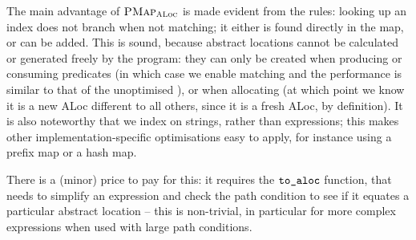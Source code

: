 The main advantage of $\textsc{PMap}_{\textsc{ALoc}}$ is made evident from the rules: looking up an index does not branch when not matching; it either is found directly in the map, or can be added. This is sound, because abstract locations cannot be calculated or generated freely by the program: they can only be created when producing or consuming predicates (in which case we enable matching and the performance is similar to that of the unoptimised \PMap{}), or when allocating (at which point we know it is a new ALoc different to all others, since it is a fresh ALoc, by definition). It is also noteworthy that we index on strings, rather than expressions; this makes other implementation-specific optimisations easy to apply, for instance using a prefix map or a hash map.

There is a (minor) price to pay for this: it requires the $\texttt{to\_aloc}$ function, that needs to simplify an expression and check the path condition to see if it equates a particular abstract location -- this is non-trivial, in particular for more complex expressions when used with large path conditions.








